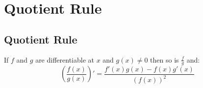\section{Quotient Rule}
\subsection{Quotient Rule}
	If $f$ and $g$ are differentiable at $x$ and $g(x) \neq 0$ then so is $\frac{f}{g}$ and:
	\[\left( \frac{f(x)}{g(x)} \right)' = \frac{f'(x)g(x) - f(x)g'(x)}{\left( f(x) \right)^2}\]
